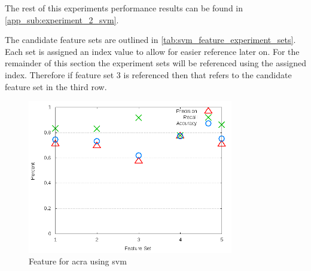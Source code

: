 The rest of this experiments performance results can be found in \autoref{app_sub:experiment_2_svm}.

The candidate feature sets are outlined in \autoref{tab:svm_feature_experiment_sets}. Each set is assigned an index value to allow for easier reference later on. For the remainder of this section the experiment sets will be referenced using the assigned index. Therefore if feature set 3 is referenced then that refers to the candidate feature set in the third row.



\begin{figure}[!t]
    \centering

        \includegraphics[width=0.8\textwidth]{images/svm/test_3/acra_sample_range}
        \caption{Feature for acra using \gls{svm}}
        \label{fig:test_3_acra_svm}
\end{figure}

